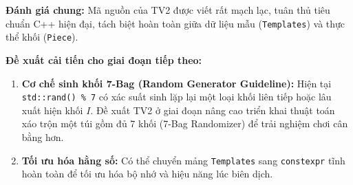 \textbf{Đánh giá chung:}
Mã nguồn của TV2 được viết rất mạch lạc, tuân thủ tiêu chuẩn C++ hiện đại, tách biệt hoàn toàn giữa dữ liệu mẫu (\texttt{Templates}) và thực thể khối (\texttt{Piece}).

\textbf{Đề xuất cải tiến cho giai đoạn tiếp theo:}
\begin{enumerate}
  \item \textbf{Cơ chế sinh khối 7-Bag (Random Generator Guideline):} Hiện tại \texttt{std::rand() \% 7} có xác suất sinh lặp lại một loại khối liên tiếp hoặc lâu xuất hiện khối $I$. Đề xuất TV2 ở giai đoạn nâng cao triển khai thuật toán xáo trộn một túi gồm đủ 7 khối (7-Bag Randomizer) để trải nghiệm chơi cân bằng hơn.
  \item \textbf{Tối ưu hóa hằng số:} Có thể chuyển mảng \texttt{Templates} sang \texttt{constexpr} tĩnh hoàn toàn để tối ưu hóa bộ nhớ và hiệu năng lúc biên dịch.
\end{enumerate}
